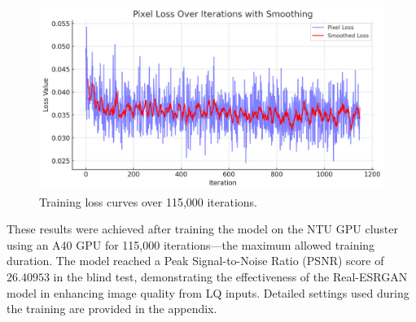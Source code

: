 \begin{figure}[htbp]
    \centering
    \includegraphics[width=\textwidth]{imgs/losses.png}
    \caption{Training loss curves over 115,000 iterations.}
    \label{fig:image5}
\end{figure}

These results were achieved after training the model on the NTU GPU cluster using an A40 GPU for 115,000 iterations—the maximum allowed training duration. The model reached a Peak Signal-to-Noise Ratio (PSNR) score of $26.40953$ in the blind test, demonstrating the effectiveness of the Real-ESRGAN model in enhancing image quality from LQ inputs. Detailed settings used during the training are provided in the appendix.
